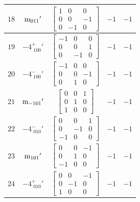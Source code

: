 \documentclass[fleqn,8pt]{jsarticle}
\begin{document}
\begin{longtable}{ccccc}
$ 18 $ & $ {\rm m}_{011}{}' $ & $ \begin{bmatrix} 1 & 0 & 0 \\ 0 & 0 & -1 \\ 0 & -1 & 0 \end{bmatrix} $ & $ -1 $ & $ -1 $ \\ \hline
$ 19 $ & $ -4^{+}_{\,\,100}{}' $ & $ \begin{bmatrix} -1 & 0 & 0 \\ 0 & 0 & 1 \\ 0 & -1 & 0 \end{bmatrix} $ & $ -1 $ & $ -1 $ \\ \hline
$ 20 $ & $ -4^{-}_{\,\,100}{}' $ & $ \begin{bmatrix} -1 & 0 & 0 \\ 0 & 0 & -1 \\ 0 & 1 & 0 \end{bmatrix} $ & $ -1 $ & $ -1 $ \\ \hline
$ 21 $ & $ {\rm m}_{-101}{}' $ & $ \begin{bmatrix} 0 & 0 & 1 \\ 0 & 1 & 0 \\ 1 & 0 & 0 \end{bmatrix} $ & $ -1 $ & $ -1 $ \\ \hline
$ 22 $ & $ -4^{-}_{\,\,010}{}' $ & $ \begin{bmatrix} 0 & 0 & 1 \\ 0 & -1 & 0 \\ -1 & 0 & 0 \end{bmatrix} $ & $ -1 $ & $ -1 $ \\ \hline
$ 23 $ & $ {\rm m}_{101}{}' $ & $ \begin{bmatrix} 0 & 0 & -1 \\ 0 & 1 & 0 \\ -1 & 0 & 0 \end{bmatrix} $ & $ -1 $ & $ -1 $ \\ \hline
$ 24 $ & $ -4^{+}_{\,\,010}{}' $ & $ \begin{bmatrix} 0 & 0 & -1 \\ 0 & -1 & 0 \\ 1 & 0 & 0 \end{bmatrix} $ & $ -1 $ & $ -1 $ \\
\end{longtable}
\end{document}
